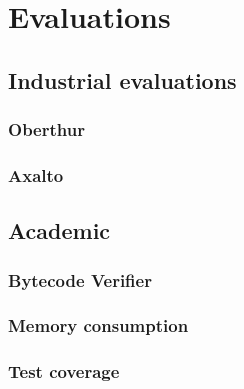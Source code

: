 \chapter{Evaluations}
\section{Industrial evaluations}
\subsection{Oberthur}
\subsection{Axalto}
\section{Academic}
\subsection{Bytecode Verifier}
\subsection{Memory consumption}
\subsection{Test coverage}
